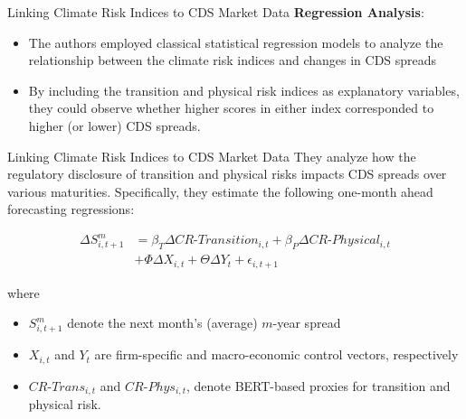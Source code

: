 \documentclass[11pt]{beamer}
\begin{document}
\begin{frame}{Linking Climate Risk Indices to CDS Market Data}
\textbf{Regression Analysis}: 

	\begin{itemize}
		\item The authors employed classical statistical regression models to analyze the relationship between the climate risk indices and changes in CDS spreads

		\item By including the transition and physical risk indices as explanatory variables, they could observe whether higher scores in either index corresponded to higher (or lower) CDS spreads.
	\end{itemize}
\end{frame}
\begin{frame}{Linking Climate Risk Indices to CDS Market Data}
They analyze how the regulatory disclosure of transition and physical risks impacts CDS spreads over various maturities. Specifically, they estimate the following one-month ahead forecasting regressions:

\begin{align*} \Delta S^m_{i,t+1} &= \beta_T \Delta CR\text{-}Transition_{i,t} + \beta_P \Delta CR\text{-}Physical_{i,t} \\ &+ \Phi \Delta X_{i,t} + \Theta \Delta Y_t + \epsilon_{i,t+1}  \end{align*}

where 

	\begin{itemize}
		\item $S^m_{i,t+1}$ denote the next month's (average) $m$-year spread  

		\item $X_{i,t}$ and $Y_t$ are firm-specific and macro-economic control vectors, respectively

		\item $CR\text{-}Trans_{i,t}$ and $CR\text{-}Phys_{i,t}$, denote BERT-based proxies for transition and physical risk.

	\end{itemize}
\end{frame}
\end{document}
